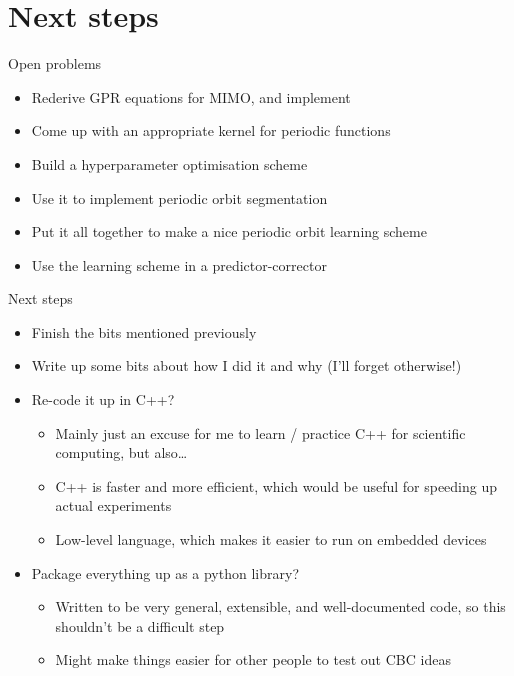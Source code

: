 \documentclass[presentation]{beamer}
\begin{document}
\section{Next steps}
\label{sec:org61b0b0b}
\begin{frame}[label={sec:orgf8a2c5b}]{Open problems}
\begin{itemize}
\item Rederive GPR equations for MIMO, and implement
\item Come up with an appropriate kernel for periodic functions
\item Build a hyperparameter optimisation scheme
\item Use it to implement periodic orbit segmentation
\item Put it all together to make a nice periodic orbit learning scheme
\item Use the learning scheme in a predictor-corrector
\end{itemize}
\end{frame}

\begin{frame}[label={sec:org96a5440}]{Next steps}
\begin{itemize}
\item Finish the bits mentioned previously
\item Write up some bits about how I did it and why (I'll forget otherwise!)
\item Re-code it up in C++?
\begin{itemize}
\item Mainly just an excuse for me to learn / practice C++ for scientific computing, but also\ldots{}
\item C++ is faster and more efficient, which would be useful for speeding up actual experiments
\item Low-level language, which makes it easier to run on embedded devices
\end{itemize}
\item Package everything up as a python library?
\begin{itemize}
\item Written to be very general, extensible, and well-documented code, so this shouldn't be a difficult step
\item Might make things easier for other people to test out CBC ideas
\end{itemize}
\end{itemize}
\end{frame}
\end{document}
